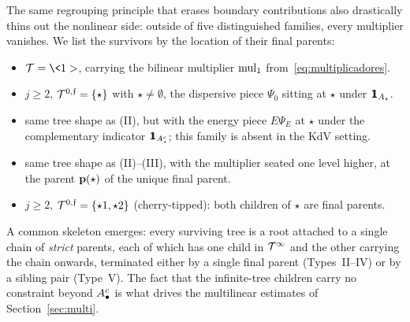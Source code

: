 The same regrouping principle that erases boundary contributions also drastically thins out the nonlinear side: outside of five distinguished families, every multiplier vanishes. We list the survivors by the location of their final parents:
\begin{itemize}
\item[\bf (I)] $\TT=\<1>$, carrying the bilinear multiplier $\operatorname{mul}_1$ from~\eqref{eq:multiplicadores}.
\item[\bf (II)] $j\ge 2$, $\mathcal{T}^{0,\mathfrak{f}}=\{\star\}$ with $\star\neq \emptyset$, the dispersive piece $\Psi_0$ sitting at $\star$ under $\ind_{A_\star}$.
\item[\bf (III)] same tree shape as (II), but with the energy piece $E\Psi_E$ at $\star$ under the complementary indicator $\ind_{A_\star^c}$; this family is absent in the KdV setting.
\item[\bf (IV)] same tree shape as (II)--(III), with the multiplier seated one level higher, at the parent $\mathbf{p}(\star)$ of the unique final parent.
\item[\bf (V)] $j\ge 2$, $\mathcal{T}^{0,\mathfrak{f}}=\{\star1,\star2\}$ (cherry-tipped): both children of $\star$ are final parents.
\end{itemize}
A common skeleton emerges: every surviving tree is a root attached to a single chain of \emph{strict} parents, each of which has one child in $\mathcal{T}^\infty$ and the other carrying the chain onwards, terminated either by a single final parent (Types~II--IV) or by a sibling pair (Type~V). The fact that the infinite-tree children carry no constraint beyond $A^c_\bullet$ is what drives the multilinear estimates of Section~\ref{sec:multi}.

